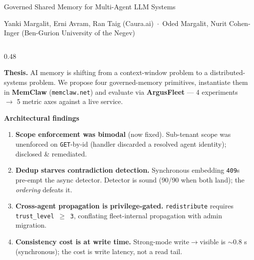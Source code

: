 \documentclass[10pt,aspectratio=169]{beamer}
\begin{document}
\begin{frame}[shrink]{Governed Shared Memory for Multi-Agent LLM Systems}

\footnotesize

{\scriptsize
Yanki Margalit, Erni Avram, Ran Taig (Caura.ai) \,$\cdot$\,
Oded Margalit, Nurit Cohen-Inger (Ben-Gurion University of the Negev)
}

\vspace{0.25em}

\begin{columns}[T,onlytextwidth]

\begin{column}{0.48\textwidth}

\textbf{Thesis.} AI memory is shifting from a context-window problem to
a distributed-systems problem. We propose four governed-memory primitives,
instantiate them in \textbf{MemClaw} (\texttt{memclaw.net}) and evaluate via
\textbf{ArgusFleet} --- 4 experiments $\to$ 5 metric axes against a live
service.

\vspace{0.3em}

\textbf{Architectural findings}
\begin{enumerate}\setlength\itemsep{0.1em}\setlength\parskip{0pt}\setlength\leftmargin{1em}
  \item \textcolor{warn}{\textbf{Scope enforcement was bimodal} (now fixed).}
        Sub-tenant scope was unenforced on \texttt{GET}-by-id (handler
        discarded a resolved agent identity); disclosed \&
        \textcolor{good}{remediated}.
  \item \textcolor{warn}{\textbf{Dedup starves contradiction detection.}}
        Synchronous embedding \texttt{409}s pre-empt the async detector.
        Detector is sound (90/90 when both land); the \emph{ordering} defeats it.
  \item \textcolor{warn}{\textbf{Cross-agent propagation is privilege-gated.}}
        \texttt{redistribute} requires \texttt{trust\_level $\ge$ 3},
        conflating fleet-internal propagation with admin migration.
  \item \textcolor{good}{\textbf{Consistency cost is at write time.}}
        Strong-mode write$\to$visible is $\sim$0.8 s (synchronous); the
        cost is write latency, not a read tail.
\end{enumerate}


\end{column}
\end{columns}
\end{frame}
\end{document}

